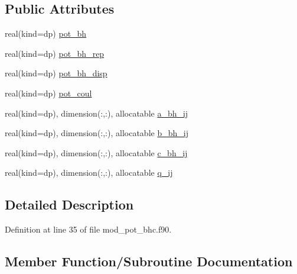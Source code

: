 \subsection*{Public Attributes}
\begin{DoxyCompactItemize}
\item 
real(kind=dp) \hyperlink{structmod__pot__bhc_1_1bhc__dimer_a484d7e6f5e02e18e3b143fb3d7dad9fe}{pot\+\_\+bh}
\item 
real(kind=dp) \hyperlink{structmod__pot__bhc_1_1bhc__dimer_aee70f0a54e8377ce4118e742375ff233}{pot\+\_\+bh\+\_\+rep}
\item 
real(kind=dp) \hyperlink{structmod__pot__bhc_1_1bhc__dimer_aa9950497c471507bd4600306eda5d452}{pot\+\_\+bh\+\_\+disp}
\item 
real(kind=dp) \hyperlink{structmod__pot__bhc_1_1bhc__dimer_a3a036423c32465c59f05e7a7c839fd9c}{pot\+\_\+coul}
\item 
real(kind=dp), dimension(\+:,\+:), allocatable \hyperlink{structmod__pot__bhc_1_1bhc__dimer_ac3f6fbdddab95918810d81e0ecdd3ab0}{a\+\_\+bh\+\_\+ij}
\item 
real(kind=dp), dimension(\+:,\+:), allocatable \hyperlink{structmod__pot__bhc_1_1bhc__dimer_a43d6cccd73b27fa0b3b51f7ca0f2ff05}{b\+\_\+bh\+\_\+ij}
\item 
real(kind=dp), dimension(\+:,\+:), allocatable \hyperlink{structmod__pot__bhc_1_1bhc__dimer_a0a677f4c6b409c36bfce8c4d0f8447fd}{c\+\_\+bh\+\_\+ij}
\item 
real(kind=dp), dimension(\+:,\+:), allocatable \hyperlink{structmod__pot__bhc_1_1bhc__dimer_a7f3af112e6df0fc8af639f4f2036307b}{q\+\_\+ij}
\end{DoxyCompactItemize}


\subsection{Detailed Description}


Definition at line 35 of file mod\+\_\+pot\+\_\+bhc.\+f90.



\subsection{Member Function/\+Subroutine Documentation}
\mbox{\label{structmod__pot__bhc_1_1bhc__dimer_a15f64c6d9173bc73fe8f651ce3da811b}} 
